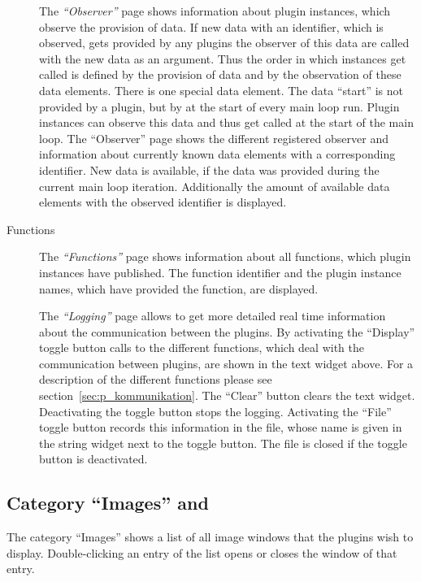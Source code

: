 \begin{description}
\item[] The \emph{``Observer''} page shows
  information about plugin instances, which observe the provision of
  data. If new data with an identifier, which is observed, gets
  provided by any plugins the observer of this data are called with
  the new data as an argument. Thus the order in which instances get
  called is defined by the provision of data and by the observation
  of these data elements. There is one special data element. The
  data ``start'' is not provided by a plugin, but by \icewing{} at
  the start of every main loop run. Plugin instances can observe
  this data and thus get called at the start of the main loop. The
  ``Observer'' page shows the different registered observer and
  information about currently known data elements with a
  corresponding identifier. New data is available, if the data was
  provided during the current main loop iteration. Additionally the
  amount of available data elements with the observed identifier is
  displayed.

\item[Functions] The \emph{``Functions''} page shows information
  about all functions, which plugin instances have published. The
  function identifier and the plugin instance names, which have
  provided the function, are displayed.

\item[] The \emph{``Logging''} page allows to get
  more detailed real time information about the communication
  between the plugins. By activating the ``Display'' toggle button
  calls to the different \icewing{} functions, which deal with the
  communication between plugins, are shown in the text widget
  above. For a description of the different functions please see
  section~\ref{sec:p_kommunikation}. The ``Clear'' button clears the
  text widget. Deactivating the toggle button stops the
  logging. Activating the ``File'' toggle button records this
  information in the file, whose name is given in the string widget
  next to the toggle button. The file is closed if the toggle button
  is deactivated.
\end{description}

\subsection{Category ``Images'' and }
\label{sub:gui_images}

The category ``Images'' shows a list of all image windows that the
plugins wish to display. Double-clicking an entry of the list
opens or closes the window of that entry.

